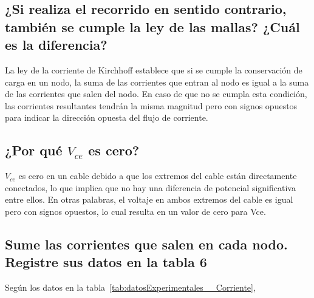 \documentclass[twocolumn, 12pt]{article}
\begin{document}
\subsection{¿Si realiza el recorrido en sentido contrario, también se cumple la ley de las mallas?
    ¿Cuál es la diferencia?}

La ley de la corriente de Kirchhoff establece que si se
cumple la conservación de carga en un nodo, la suma de las
corrientes que entran al nodo es igual a la suma de las
corrientes que salen del nodo. En caso de que no se cumpla
esta condición, las corrientes resultantes tendrán la misma
magnitud pero con signos opuestos para indicar la dirección
opuesta del flujo de corriente.

\subsection{¿Por qué $V_{ce}$ es cero?}

$V_{ce}$ es cero en un cable debido a que los extremos del cable
están directamente conectados, lo que implica que no hay
una diferencia de potencial significativa entre ellos. En
otras palabras, el voltaje en ambos extremos del cable es
igual pero con signos opuestos, lo cual resulta en un valor
de cero para Vce.

\subsection{Sume las corrientes que salen en cada nodo. Registre sus datos en la tabla 6}

Según los datos en la
tabla~\ref{tab:datosExperimentales__Corriente},
\end{document}
